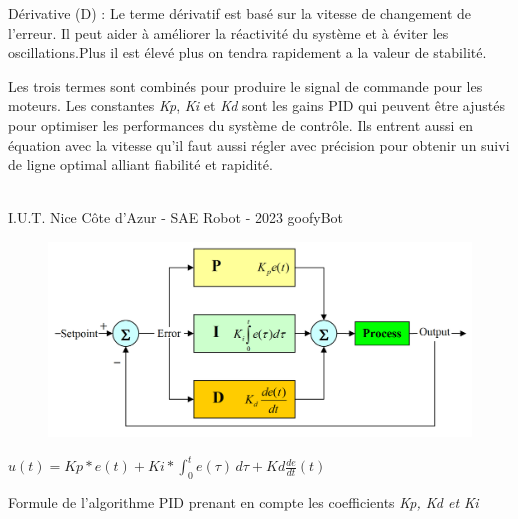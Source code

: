 Dérivative (D) : Le terme dérivatif est basé sur la vitesse de changement de l'erreur. Il peut aider à améliorer la réactivité du système et à éviter les oscillations.Plus il est élevé plus on tendra rapidement a la valeur de stabilité.

Les trois termes sont combinés pour produire le signal de commande pour les moteurs. Les constantes \textit{Kp}, \textit{Ki} et \textit{Kd} sont les gains PID qui peuvent être ajustés pour optimiser les performances du système de contrôle. Ils entrent aussi en équation avec la vitesse qu'il faut aussi régler avec précision pour obtenir un suivi de ligne optimal alliant fiabilité et rapidité.

\vfill
\noindent\makebox[\linewidth]{\rule{.8\paperwidth}{.6pt}}\\[0.2cm]
I.U.T. Nice Côte d'Azur - SAE Robot - 2023 \hfill goofyBot
\noindent\makebox[\linewidth]{\rule{.8\paperwidth}{.6pt}}
\newpage

\begin{figure}[H]
\centering
\begin{minipage}{.5\textwidth}
  \centering
  \centerline{\includegraphics[width=1.2\linewidth]{img/pid.png}}
  \label{fig:PID}
\end{minipage}%
\end{figure}

\begin{center}
    $u(t) = Kp * e(t) + Ki * \int_{0}^{t} e(\tau) \,d\tau + Kd \frac{de}{dt}(t)$
    
    Formule de l'algorithme PID prenant en compte les coefficients \emph{Kp, Kd et Ki}
\end{center}

